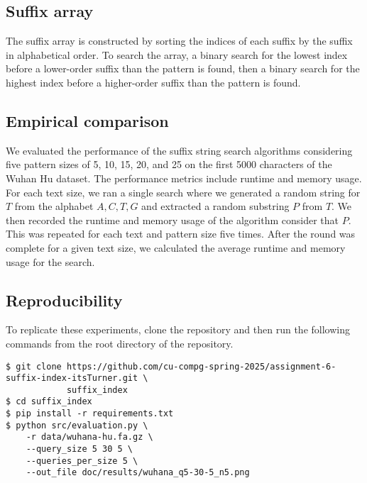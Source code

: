 \documentclass[11pt, letterpaper]{article}
\begin{document}
\subsection{Suffix array}
The suffix array is constructed by sorting the indices of each suffix by the suffix in alphabetical order. To search the array, a binary search for the lowest index before a lower-order suffix than the pattern is found, then a binary search for the highest index before a higher-order suffix than the pattern is found.

\subsection{Empirical comparison}

We evaluated the performance of the suffix string search algorithms considering five pattern sizes of 5, 10, 15, 20, and 25 on the first 5000 characters of the Wuhan Hu dataset. The performance metrics include runtime and memory usage. For each text size, we ran a single search where we generated a random string for $T$ from the alphabet ${A, C, T, G}$ and extracted a random substring $P$ from $T$. We then recorded the runtime and memory usage of the algorithm consider that $P$. This was repeated for each text and pattern size five times. After the round was complete for a given text size, we calculated the average runtime and memory usage for the search.

\subsection{Reproducibility}
To replicate these experiments, clone the repository and then run the
following commands from the root directory of the repository.
\begin{verbatim}
$ git clone https://github.com/cu-compg-spring-2025/assignment-6-suffix-index-itsTurner.git \
            suffix_index
$ cd suffix_index
$ pip install -r requirements.txt
$ python src/evaluation.py \
    -r data/wuhana-hu.fa.gz \
    --query_size 5 30 5 \
    --queries_per_size 5 \
    --out_file doc/results/wuhana_q5-30-5_n5.png
\end{verbatim}
\end{document}
